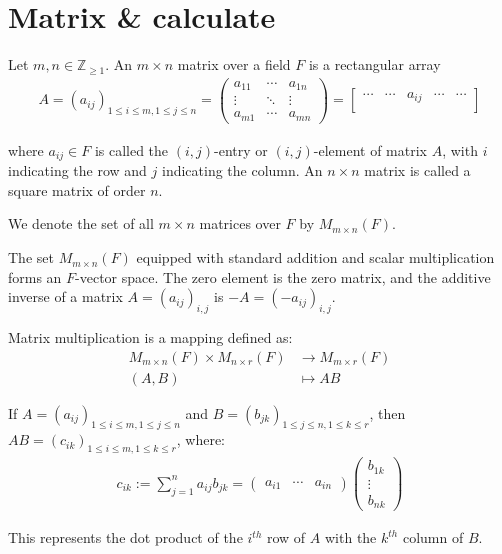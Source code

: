 \section{Matrix \& calculate}

\begin{definition}
  Let $m,n \in \mathbb{Z}_{\geq 1}$. An $m \times n$ matrix over a field $F$ is a rectangular array
  \begin{align*}
    A = (a_{ij})_{1 \leq i \leq m, 1 \leq j \leq n} =
    \begin{pmatrix}
      a_{11} & \cdots & a_{1n} \\
      \vdots & \ddots & \vdots \\
      a_{m1} & \cdots & a_{mn}
    \end{pmatrix} =
    \begin{bmatrix}
      \cdots & \cdots & a_{ij} & \cdots & \cdots \\
    \end{bmatrix}
  \end{align*}

  \noindent where $a_{ij} \in F$ is called the $(i,j)$-entry or $(i,j)$-element of matrix $A$, with $i$ indicating the row and $j$ indicating the column. An $n \times n$ matrix is called a square matrix of order $n$.

  We denote the set of all $m \times n$ matrices over $F$ by $M_{m \times n}(F)$.
\end{definition}

\begin{proposition}
  The set $M_{m \times n}(F)$ equipped with standard addition and scalar multiplication forms an $F$-vector space. The zero element is the zero matrix, and the additive inverse of a matrix $A = (a_{ij})_{i,j}$ is $-A = (-a_{ij})_{i,j}$.
\end{proposition}

\begin{definition}
  Matrix multiplication is a mapping defined as:
  \begin{align*}
    M_{m \times n}(F) \times M_{n \times r}(F) &\rightarrow M_{m \times r}(F)\\
    (A, B) &\mapsto AB
  \end{align*}

  If $A = (a_{ij})_{1 \leq i \leq m, 1 \leq j \leq n}$ and $B = (b_{jk})_{1 \leq j \leq n, 1 \leq k \leq r}$, then $AB = (c_{ik})_{1 \leq i \leq m, 1 \leq k \leq r}$, where:
  \begin{align*}
    c_{ik} := \sum_{j=1}^{n} a_{ij}b_{jk} =
    \begin{pmatrix} a_{i1} & \cdots & a_{in}
    \end{pmatrix}
    \begin{pmatrix} b_{1k} \\ \vdots \\ b_{nk}
    \end{pmatrix}
  \end{align*}

  This represents the dot product of the $i^{th}$ row of $A$ with the $k^{th}$ column of $B$.
\end{definition}

